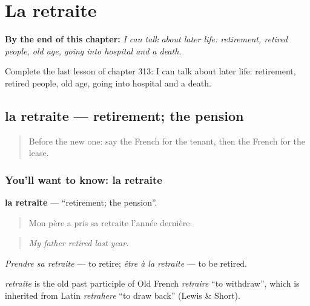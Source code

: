 
\chapter{La retraite}
\label{ch:fr-la-retraite}

\begin{chapteropening}
\textbf{By the end of this chapter:} \emph{I can talk about later life: retirement, retired people, old age, going into hospital and a death.}

Complete the last lesson of chapter 313: I can talk about later life: retirement, retired people, old age, going into hospital and a death.
\end{chapteropening}

\section[la retraite]{la retraite — retirement; the pension}

\label{lesson:FR-C313-retraite}



\begin{quote}
Before the new one: say the French for the tenant, then the French for the lease.
\end{quote}

\subsection*{You'll want to know: la retraite}
\textbf{la retraite} — \textquotedblleft{}retirement; the pension\textquotedblright{}.

\begin{quote}
Mon père a pris sa retraite l'année dernière.
\end{quote}

\begin{quote}
\emph{My father retired last year.}
\end{quote}

\emph{Prendre sa retraite} — to retire; \emph{être à la retraite} — to be retired.

\begin{cousinweb}
\emph{retraite} is the old past participle of Old French \emph{retraire} \textquotedblleft{}to withdraw\textquotedblright{}, which is inherited from Latin \emph{retrahere} \textquotedblleft{}to draw back\textquotedblright{} (Lewis \& Short).
\end{cousinweb}

